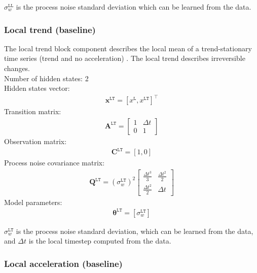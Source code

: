 \noindent
$\sigma_{w}^{\mathtt{LL}}$ is the process noise standard deviation which can be learned from the data.

\subsubsection{Local trend (baseline)}

The local trend block component describes the local mean of a trend-stationary time series (trend and no acceleration) \cite{STC:STC2035}. 
The local trend describes irreversible changes.\\

\noindent
Number of hidden states: 2\\

Hidden states vector: 
\begin{gather*}
 \mathbf{x}^{\mathtt{LT}} = [x^{\mathtt{L}}, x^{\mathtt{LT}}]^{\intercal}
 \end{gather*}
Transition matrix: 
\begin{gather*}
\mathbf{A}^{\mathtt{LT}}= \left[\begin{array}{cc}1 &\Delta t\\0&1\end{array}\right]
\end{gather*}
Observation matrix: 
\begin{gather*}
\mathbf{C}^{\mathtt{LT}}=[1, 0]
\end{gather*}
Process noise covariance matrix: 
\begin{gather*}
\mathbf{Q}^{\mathtt{LT}}= (\sigma_{w}^{\mathtt{LT}})^{2}\left[\begin{array}{cc}\tfrac{\Delta t^{3}}{3} &\tfrac{\Delta t^{2}}{2}\\\tfrac{\Delta t^{2}}{2}&\Delta t\end{array}\right]
\end{gather*}
Model parameters: 
\begin{gather*}
\bm\theta^{\mathtt{LT}}=[\sigma_{w}^{\mathtt{LT}} ]
\end{gather*}

\noindent
$\sigma_{w}^{\mathtt{LT}}$ is the process noise standard deviation, which can be learned from the data, and $\Delta t$ is the local timestep computed from the data.


\subsubsection{Local acceleration (baseline)}

